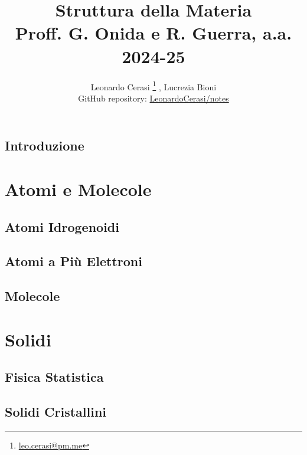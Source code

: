 \documentclass[a4paper, 12pt]{book}
\title{\Huge\textbf{Struttura della Materia} \\ \large Proff. G. Onida e R. Guerra, a.a. 2024-25}
\author{Leonardo Cerasi%
	\thanks{\scriptsize\href{mailto:leonardo.cerasi@studenti.unimi.it}{leo.cerasi@pm.me}}%
	, Lucrezia Bioni\\
	\small GitHub repository: \href{https://github.com/LeonardoCerasi/notes}{LeonardoCerasi/notes}}
\begin{document}
\frontmatter

\maketitle
\tableofcontents
\pagestyle{indice}

\mainmatter

\chapter*{Introduzione}
\pagestyle{introd}


\part{Atomi e Molecole}
\pagestyle{body}

\chapter{Atomi Idrogenoidi}


\chapter{Atomi a Più Elettroni}


\chapter{Molecole}


\part{Solidi}
\pagestyle{body}

\chapter{Fisica Statistica}


\chapter{Solidi Cristallini}

\end{document}
